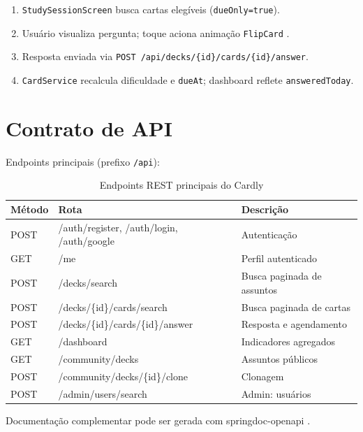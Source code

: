 \begin{enumerate}
    \item \texttt{StudySessionScreen} busca cartas elegíveis (\texttt{dueOnly=true}).
    \item Usuário visualiza pergunta; toque aciona animação \texttt{FlipCard} \cite{w3schools_flip,reanimated_docs}.
    \item Resposta enviada via \texttt{POST /api/decks/\{id\}/cards/\{id\}/answer}.
    \item \texttt{CardService} recalcula dificuldade e \texttt{dueAt}; dashboard reflete \texttt{answeredToday}.
\end{enumerate}

\section{Contrato de API}

Endpoints principais (prefixo \texttt{/api}):

\begin{table}[htbp]
    \caption{Endpoints REST principais do Cardly}
    \label{tab:endpoints}
    \centering
    \small
    \begin{tabular}{lll}
        \toprule
        \textbf{Método} & \textbf{Rota} & \textbf{Descrição} \\
        \midrule
        POST & /auth/register, /auth/login, /auth/google & Autenticação \\
        GET & /me & Perfil autenticado \\
        POST & /decks/search & Busca paginada de assuntos \\
        POST & /decks/\{id\}/cards/search & Busca paginada de cartas \\
        POST & /decks/\{id\}/cards/\{id\}/answer & Resposta e agendamento \\
        GET & /dashboard & Indicadores agregados \\
        GET & /community/decks & Assuntos públicos \\
        POST & /community/decks/\{id\}/clone & Clonagem \\
        POST & /admin/users/search & Admin: usuários \\
        \bottomrule
    \end{tabular}
\end{table}

Documentação complementar pode ser gerada com springdoc-openapi \cite{openapi_springdoc}.

